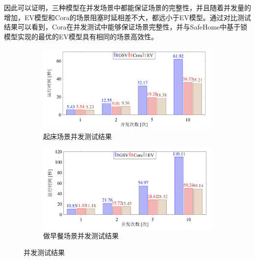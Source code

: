 \documentclass[winfonts,master,twoside]{njuthesis}
\begin{document}
  
因此可以证明，三种模型在并发场景中都能保证场景的完整性，并且随着并发量的增加，EV模型和Cora的场景阻塞时延相差不大，都远小于EV模型。通过对比测试结果可以看到，Cora在并发测试中能够保证场景完整性，并与SafeHome中基于锁模型实现的最优的EV模型具有相同的场景高效性。
\begin{figure}[H]
	\begin{subfigure}{.5\textwidth}
		\centering
		\includegraphics[width=1\textwidth]{figure/5-experiment/concurrency_1.png}
		\caption{起床场景并发测试结果}
		\label{subfig:a}
	\end{subfigure}
	\begin{subfigure}{.5\textwidth}
		\centering
		\includegraphics[width=1\textwidth]{figure/5-experiment/concurrency_2.png}
		\caption{做早餐场景并发测试结果}
		\label{subfig:b}
	\end{subfigure}
\caption{并发测试结果}
\label{fig:sub}
\end{figure}

    
\end{document}

